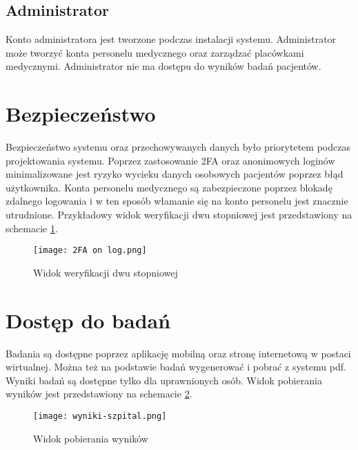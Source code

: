 \documentclass{documentation}
\begin{document}
\subsection{Administrator}

Konto administratora jest tworzone podczas instalacji systemu.
Administrator może tworzyć konta personelu medycznego oraz zarządzać placówkami medycznymi.
Administrator nie ma dostępu do wyników badań pacjentów.

\section{Bezpieczeństwo}

Bezpieczeństwo systemu oraz przechowywanych danych było priorytetem podczas projektowania systemu.
Poprzez zastosowanie 2FA oraz anonimowych loginów minimalizowane jest ryzyko wycieku danych osobowych pacjentów poprzez błąd użytkownika.
Konta personelu medycznego są zabezpieczone poprzez blokadę zdalnego logowania i w ten sposób włamanie się na konto personelu jest znacznie utrudnione.
Przykładowy widok weryfikacji dwu stopniowej jest przedstawiony na schemacie \ref{fig:2FA}.

\begin{figure}[h]
    \centering
    \texttt{[image: 2FA on log.png]}
    \caption{Widok weryfikacji dwu stopniowej\label{fig:2FA}}
\end{figure}

\section{Dostęp do badań}

Badania są dostępne poprzez aplikację mobilną oraz stronę internetową w postaci wirtualnej.
Można też na podstawie badań wygenerować i pobrać z systemu pdf.
Wyniki badań są dostępne tylko dla uprawnionych osób.
Widok pobierania wyników jest przedstawiony na schemacie \ref{fig:results}.

\begin{figure}[h]
    \centering
    \texttt{[image: wyniki-szpital.png]}
    \caption{Widok pobierania wyników\label{fig:results}}
\end{figure}
\end{document}
